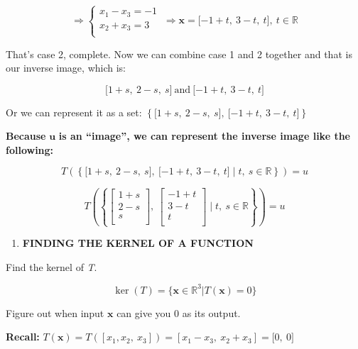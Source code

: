 \documentclass[12pt]{article}
\theoremstyle{plain}
\theoremstyle{remark}
\theoremstyle{definition}
\begin{document}
\[\Rightarrow \left\{ \begin{matrix}
x_{1} - x_{3} = - 1 \\
x_{2} + x_{3} = 3 \\
\end{matrix} \right.\  \Rightarrow \mathbf{x} = \lbrack - 1 + t,\ 3 - t,\ t\rbrack,\ t\mathbb{\in R}\]

That's case 2, complete. Now we can combine case 1 and 2 together and
that is our inverse image, which is:

\[\lbrack 1 + s,\ 2 - s,\ s\rbrack\ \text{and}\ \lbrack - 1 + t,\ 3 - t,\ t\rbrack\]

Or we can represent it as a set:
\(\left\{ \lbrack 1 + s,\ 2 - s,\ s\rbrack,\ \lbrack - 1 + t,\ 3 - t,\ t\rbrack \right\}\)

\textbf{Because} \(\mathbf{u}\) \textbf{is an ``image'', we can
represent the inverse image like the following:}

\[T\left( \left\{ \lbrack 1 + s,\ 2 - s,\ s\rbrack,\ \lbrack - 1 + t,\ 3 - t,\ t\rbrack\mid t,\ s\mathbb{\in R} \right\} \right) = u\]

\[T\left( \left\{ \begin{bmatrix}
1 + s \\
2 - s \\
s \\
\end{bmatrix},\ \begin{bmatrix}
 - 1 + t \\
3 - t \\
t \\
\end{bmatrix}\mid t,\ s\mathbb{\in R} \right\} \right) = u\]

\begin{enumerate}
\def\labelenumi{\arabic{enumi}.}
\setcounter{enumi}{3}
\item
  \textbf{FINDING THE KERNEL OF A FUNCTION}
\end{enumerate}

Find the kernel of \emph{T}.

\[\ker(T) = \{\mathbf{x} \in \mathbb{R}^{3}|T\left( \mathbf{x} \right) = 0\}\]

Figure out when input \(\mathbf{x}\) can give you 0 as its output.

\textbf{Recall:}
\(T\left( \mathbf{x} \right) = T\left( \left\lbrack x_{1},x_{2},\ x_{3} \right\rbrack \right) = \left\lbrack x_{1} - x_{3},\ x_{2} + x_{3} \right\rbrack = \lbrack 0,\ 0\rbrack\)
\end{document}
